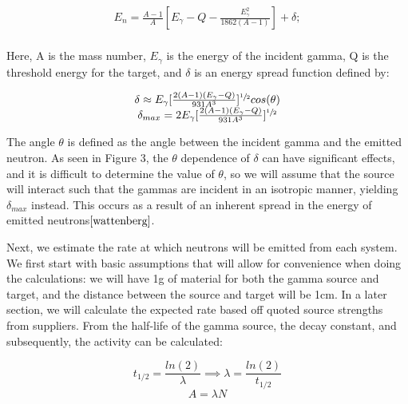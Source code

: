 \documentclass[%
12pt,
twoside,
reprint,
amsmath,amssymb,
aps,
]{article}
\begin{document}
	\begin{equation}
	\begin{array}{c}
	E_{n} = \frac{A - 1}{A} [E_{\gamma} - Q - \frac{E_{\gamma}^{2}}{1862 (A - 1)}] + \delta; \\
	\end{array}
	\end{equation}
	
	\noindent Here, A is the mass number, $E_{\gamma}$ is the energy of the incident gamma, Q is the threshold energy for the target, and $\delta$ is an energy spread function defined by:
	
	\begin{equation}
	\begin{array}{c}
	\delta \approx E_{\gamma}[\frac{2(A-1)(E_{\gamma}-Q)}{931A^{3}}]^{\sfrac{1}{2}} cos(\theta) \\
	\delta_{max} = 2E_{\gamma}[\frac{2(A-1)(E_{\gamma}-Q)}{931A^{3}}]^{\sfrac{1}{2}}
	\end{array}
	\end{equation}
	
	\noindent The angle $\theta$ is defined as the angle between the incident gamma and the emitted neutron. As seen in Figure 3, the $\theta$ dependence of $\delta$ can have significant effects, and it is difficult to determine the value of $\theta$, so we will assume that the source will interact such that the gammas are incident in an isotropic manner, yielding $\delta_{max}$ instead. This occurs as a result of an inherent spread in the energy of emitted neutrons${\cite{wattenberg}}$.
	
	\par Next, we estimate the rate at which neutrons will be emitted from each system. We first start with basic assumptions that will allow for convenience when doing the calculations: we will have 1g of material for both the gamma source and target, and the distance between the source and target will be 1cm. In a later section, we will calculate the expected rate based off quoted source strengths from suppliers. From the half-life of the gamma source, the decay constant, and subsequently, the activity can be calculated:
	
	\begin{equation*}
	t_{1/2} = \frac{ln(2)}{\lambda} \implies \lambda = \frac{ln(2)}{t_{1/2}}
	\end{equation*}
	\begin{equation*}
	A = \lambda N
	\end{equation*}
	
\end{document}
